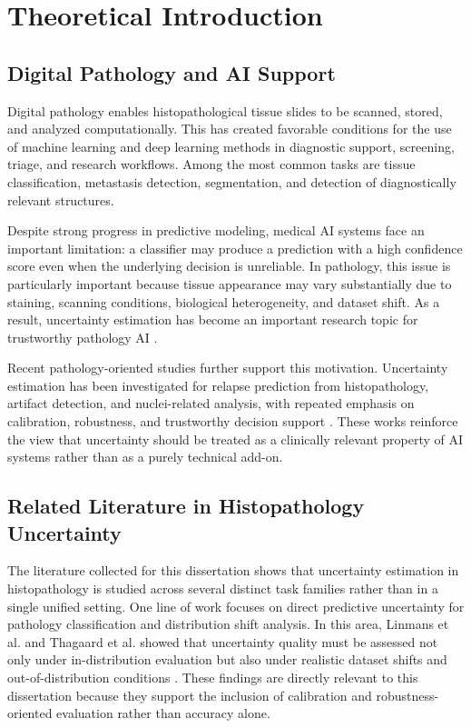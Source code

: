 \chapter{Theoretical Introduction}
\label{chap:theory}

\section{Digital Pathology and AI Support}

Digital pathology enables histopathological tissue slides to be scanned, stored, and analyzed computationally. This has created favorable conditions for the use of machine learning and deep learning methods in diagnostic support, screening, triage, and research workflows. Among the most common tasks are tissue classification, metastasis detection, segmentation, and detection of diagnostically relevant structures.

Despite strong progress in predictive modeling, medical AI systems face an important limitation: a classifier may produce a prediction with a high confidence score even when the underlying decision is unreliable. In pathology, this issue is particularly important because tissue appearance may vary substantially due to staining, scanning conditions, biological heterogeneity, and dataset shift. As a result, uncertainty estimation has become an important research topic for trustworthy pathology AI \cite{linmans2022ood,thagaard2020datasetshift}.

Recent pathology-oriented studies further support this motivation. Uncertainty estimation has been investigated for relapse prediction from histopathology, artifact detection, and nuclei-related analysis, with repeated emphasis on calibration, robustness, and trustworthy decision support \cite{dolezal2022uncertainty,kanwal2024artifact,gudhe2023nuclei}. These works reinforce the view that uncertainty should be treated as a clinically relevant property of AI systems rather than as a purely technical add-on.

\section{Related Literature in Histopathology Uncertainty}

The literature collected for this dissertation shows that uncertainty estimation in histopathology is studied across several distinct task families rather than in a single unified setting. One line of work focuses on direct predictive uncertainty for pathology classification and distribution shift analysis. In this area, Linmans et al. and Thagaard et al. showed that uncertainty quality must be assessed not only under in-distribution evaluation but also under realistic dataset shifts and out-of-distribution conditions \cite{linmans2022ood,thagaard2020datasetshift}. These findings are directly relevant to this dissertation because they support the inclusion of calibration and robustness-oriented evaluation rather than accuracy alone.

